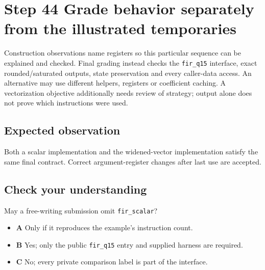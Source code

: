 \section{Step 44 Grade behavior separately from the illustrated temporaries}\label{fir-s44}

Construction observations name registers so this particular sequence can be explained and checked. Final grading instead checks the \texttt{fir\_q15} interface, exact rounded/saturated outputs, state preservation and every caller-data access. An alternative may use different helpers, registers or coefficient caching. A vectorization objective additionally needs review of strategy; output alone does not prove which instructions were used.

\subsection{Expected observation}
Both a scalar implementation and the widened-vector implementation satisfy the same final contract. Correct argument-register changes after last use are accepted.

\subsection{Check your understanding}
May a free-writing submission omit \texttt{fir\_scalar}?

\begin{itemize}
\item \textbf{A} Only if it reproduces the example’s instruction count.
\item \textbf{B} Yes; only the public \texttt{fir\_q15} entry and supplied harness are required.
\item \textbf{C} No; every private comparison label is part of the interface.
\end{itemize}
